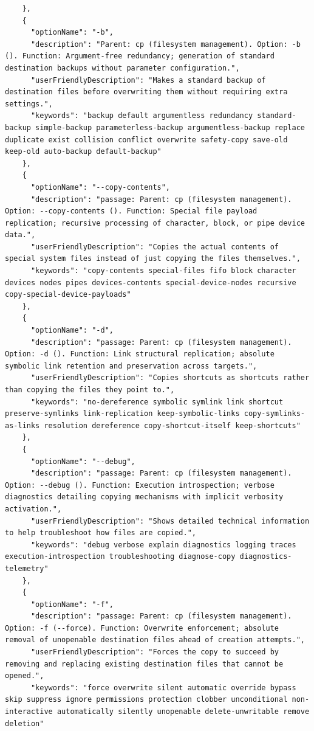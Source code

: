 \begin{appendix}
\begin{lstlisting}
    },
    {
      "optionName": "-b",
      "description": "Parent: cp (filesystem management). Option: -b (). Function: Argument-free redundancy; generation of standard destination backups without parameter configuration.",
      "userFriendlyDescription": "Makes a standard backup of destination files before overwriting them without requiring extra settings.",
      "keywords": "backup default argumentless redundancy standard-backup simple-backup parameterless-backup argumentless-backup replace duplicate exist collision conflict overwrite safety-copy save-old keep-old auto-backup default-backup"
    },
    {
      "optionName": "--copy-contents",
      "description": "passage: Parent: cp (filesystem management). Option: --copy-contents (). Function: Special file payload replication; recursive processing of character, block, or pipe device data.",
      "userFriendlyDescription": "Copies the actual contents of special system files instead of just copying the files themselves.",
      "keywords": "copy-contents special-files fifo block character devices nodes pipes devices-contents special-device-nodes recursive copy-special-device-payloads"
    },
    {
      "optionName": "-d",
      "description": "passage: Parent: cp (filesystem management). Option: -d (). Function: Link structural replication; absolute symbolic link retention and preservation across targets.",
      "userFriendlyDescription": "Copies shortcuts as shortcuts rather than copying the files they point to.",
      "keywords": "no-dereference symbolic symlink link shortcut preserve-symlinks link-replication keep-symbolic-links copy-symlinks-as-links resolution dereference copy-shortcut-itself keep-shortcuts"
    },
    {
      "optionName": "--debug",
      "description": "passage: Parent: cp (filesystem management). Option: --debug (). Function: Execution introspection; verbose diagnostics detailing copying mechanisms with implicit verbosity activation.",
      "userFriendlyDescription": "Shows detailed technical information to help troubleshoot how files are copied.",
      "keywords": "debug verbose explain diagnostics logging traces execution-introspection troubleshooting diagnose-copy diagnostics-telemetry"
    },
    {
      "optionName": "-f",
      "description": "passage: Parent: cp (filesystem management). Option: -f (--force). Function: Overwrite enforcement; absolute removal of unopenable destination files ahead of creation attempts.",
      "userFriendlyDescription": "Forces the copy to succeed by removing and replacing existing destination files that cannot be opened.",
      "keywords": "force overwrite silent automatic override bypass skip suppress ignore permissions protection clobber unconditional non-interactive automatically silently unopenable delete-unwritable remove deletion"

\end{lstlisting}
\end{appendix}
